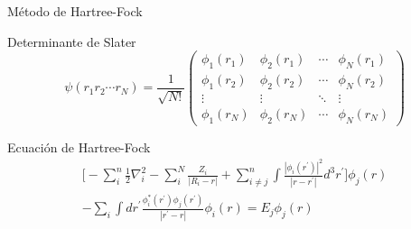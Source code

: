 \begin{frame}{M\'etodo de Hartree-Fock}
    
    \begin{block}{Determinante de Slater}
        \begin{equation}
        \psi (r_{1}r_{2}\cdots r_{N}) = \frac{1}{\sqrt{N!}} 
        \left ( 
        \begin{array}{cccc}
        \phi _{1}(r_{1}) & \phi _{2}(r_{1}) & \cdots & \phi _{N}(r_{1}) \\
        \phi _{1}(r_{2}) & \phi _{2}(r_{2}) & \cdots & \phi _{N}(r_{2}) \\
        \vdots & \vdots & \ddots & \vdots \\
        \phi _{1}(r_{N}) & \phi _{2}(r_{N}) & \cdots & \phi _{N}(r_{N})
        \end{array} 
        \right ) \nonumber
        \end{equation}
    \end{block}
    
    \begin{block}{Ecuaci\'on de Hartree-Fock}
        \begin{eqnarray}
        \big [ - \sum _{i}^{n} \frac{1}{2} \nabla _{i}^{2} - \sum _{i} ^{N} 
        \frac{Z_{i}}{|R_{i}-r|} + \sum _{i \ne j} ^{n} \int \frac{|\phi 
            _{i}(r^{\prime})|^{2}}{|r-r^{\prime }|}d^{3}r^{\prime} \big] \phi 
            _{j} 
        (r) \nonumber \\ - \sum _{i} \int dr^{\prime} \frac{\phi 
            _{i}^{*}(r^{\prime}) \phi 
            _{j}(r^{\prime})}{|r^{\prime}-r|} \phi_{i}(r) = E_{j} \phi _{j}(r) 
        \nonumber
        \end{eqnarray}
    \end{block}
    
\end{frame}